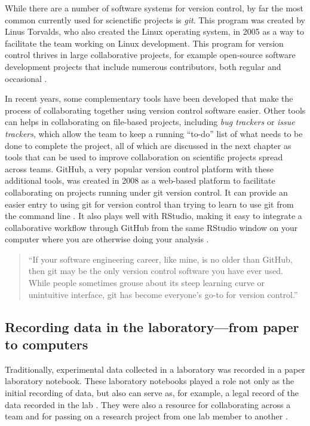 \documentclass[]{tufte-book}
\begin{document}
While there are a number of software systems for version control, by far the
most common currently used for scienctific projects is \emph{git}. This program was
created by Linus Torvalds, who also created the Linux operating system, in 2005
as a way to facilitate the team working on Linux development. This program for
version control thrives in large collaborative projects, for example open-source
software development projects that include numerous contributors, both regular
and occasional \citep{brown2018git}.

In recent years, some complementary tools have been developed that make the
process of collaborating together using version control software easier. Other
tools can helps in collaborating on file-based projects, including \emph{bug
trackers} or \emph{issue trackers}, which allow the team to keep a running ``to-do''
list of what needs to be done to complete the project, all of which are
discussed in the next chapter as tools that can be used to improve collaboration
on scientific projects spread across teams. GitHub, a very popular version
control platform with these additional tools, was created in 2008 as a web-based
platform to facilitate collaborating on projects running under git version
control. It can provide an easier entry to using git for version control than
trying to learn to use git from the command line \citep{perez2016ten}. It also plays
well with RStudio, making it easy to integrate a collaborative workflow through
GitHub from the same RStudio window on your computer where you are otherwise
doing your analysis \citep{perez2016ten}.

\begin{quote}
``If your software engineering career, like mine, is no older than GitHub, then
git may be the only version control software you have ever used. While people
sometimes grouse about its steep learning curve or unintuitive interface, git has
become everyone's go-to for version control.'' \citep{target2018version}
\end{quote}

\hypertarget{recording-data-in-the-laboratoryfrom-paper-to-computers}{%
\subsection{Recording data in the laboratory---from paper to computers}\label{recording-data-in-the-laboratoryfrom-paper-to-computers}}

Traditionally, experimental data collected in a laboratory was recorded in a
paper laboratory notebook. These laboratory notebooks played a role not only as
the initial recording of data, but also can serve as, for example, a legal
record of the data recorded in the lab \citep{mascarelli2014research}. They were also
a resource for collaborating across a team and for passing on a research project
from one lab member to another \citep{butler2005electronic}.
\end{document}
